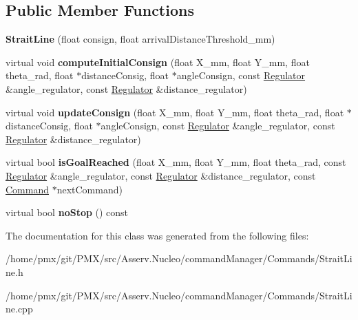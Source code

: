 \subsection*{Public Member Functions}
\begin{DoxyCompactItemize}
\item 
\mbox{\label{classStraitLine_a031403b9b025400cc66e57a648bb0fad}} 
{\bfseries Strait\+Line} (float consign, float arrival\+Distance\+Threshold\+\_\+mm)
\item 
\mbox{\label{classStraitLine_a8f731b8a10d9d4040cc6e9a6eb1dab1e}} 
virtual void {\bfseries compute\+Initial\+Consign} (float X\+\_\+mm, float Y\+\_\+mm, float theta\+\_\+rad, float $\ast$distance\+Consig, float $\ast$angle\+Consign, const \hyperlink{classRegulator}{Regulator} \&angle\+\_\+regulator, const \hyperlink{classRegulator}{Regulator} \&distance\+\_\+regulator)
\item 
\mbox{\label{classStraitLine_ae72d0d9cf3fcda82792f131050c3e5b2}} 
virtual void {\bfseries update\+Consign} (float X\+\_\+mm, float Y\+\_\+mm, float theta\+\_\+rad, float $\ast$distance\+Consig, float $\ast$angle\+Consign, const \hyperlink{classRegulator}{Regulator} \&angle\+\_\+regulator, const \hyperlink{classRegulator}{Regulator} \&distance\+\_\+regulator)
\item 
\mbox{\label{classStraitLine_a6628786ffe3b33496f196fc0c2376cee}} 
virtual bool {\bfseries is\+Goal\+Reached} (float X\+\_\+mm, float Y\+\_\+mm, float theta\+\_\+rad, const \hyperlink{classRegulator}{Regulator} \&angle\+\_\+regulator, const \hyperlink{classRegulator}{Regulator} \&distance\+\_\+regulator, const \hyperlink{classCommand}{Command} $\ast$next\+Command)
\item 
\mbox{\label{classStraitLine_a504f164f7f113291f351d53ce2311dbf}} 
virtual bool {\bfseries no\+Stop} () const
\end{DoxyCompactItemize}


The documentation for this class was generated from the following files\+:\begin{DoxyCompactItemize}
\item 
/home/pmx/git/\+P\+M\+X/src/\+Asserv.\+Nucleo/command\+Manager/\+Commands/Strait\+Line.\+h\item 
/home/pmx/git/\+P\+M\+X/src/\+Asserv.\+Nucleo/command\+Manager/\+Commands/Strait\+Line.\+cpp\end{DoxyCompactItemize}
